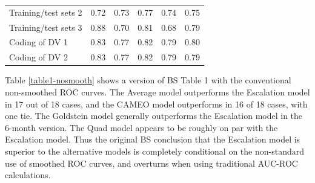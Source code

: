 \documentclass[]{article}
\begin{document}
\begin{table}[t]
\begin{tabular}{lrrrrr}
\hspace{1em}Training/test sets 2 & 0.72 & 0.73 & 0.77 & 0.74 & 0.75\\
\hspace{1em}Training/test sets 3 & 0.88 & 0.70 & 0.81 & 0.68 & 0.79\\
\hspace{1em}Coding of DV 1 & 0.83 & 0.77 & 0.82 & 0.79 & 0.80\\
\hspace{1em}Coding of DV 2 & 0.83 & 0.77 & 0.82 & 0.79 & 0.79\\
\bottomrule
\end{tabular}
\end{table}

Table \ref{table1-nosmooth} shows a version of BS Table 1 with the
conventional non-smoothed ROC curves. The Average model outperforms the
Escalation model in 17 out of 18 cases, and the CAMEO model outperforms
in 16 of 18 cases, with one tie. The Goldstein model generally
outperforms the Escalation model in the 6-month version. The Quad model
appears to be roughly on par with the Escalation model. Thus the
original BS conclusion that the Escalation model is superior to the
alternative models is completely conditional on the non-standard use of
smoothed ROC curves, and overturns when using traditional AUC-ROC
calculations.
\end{document}
